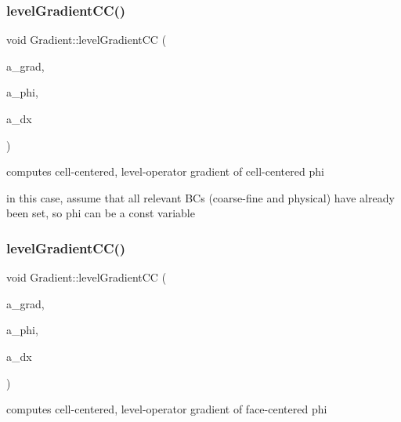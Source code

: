 \subsubsection{\texorpdfstring{level\+Gradient\+C\+C()}{levelGradientCC()}\hspace{0.1cm}{\footnotesize\ttfamily [4/6]}}
{\footnotesize\ttfamily void Gradient\+::level\+Gradient\+CC (\begin{DoxyParamCaption}\item[{\textbf{ Level\+Data}$<$ \textbf{ F\+Array\+Box} $>$ \&}]{a\+\_\+grad,  }\item[{const \textbf{ Level\+Data}$<$ \textbf{ F\+Array\+Box} $>$ \&}]{a\+\_\+phi,  }\item[{const \textbf{ Real}}]{a\+\_\+dx }\end{DoxyParamCaption})\hspace{0.3cm}{\ttfamily [static]}}



computes cell-\/centered, level-\/operator gradient of cell-\/centered phi 

in this case, assume that all relevant BC\textquotesingle{}s (coarse-\/fine and physical) have already been set, so phi can be a const variable \mbox{\label{class_gradient_a8962d5f7dabe25690dce34ce1c00726d}} 
\subsubsection{\texorpdfstring{level\+Gradient\+C\+C()}{levelGradientCC()}\hspace{0.1cm}{\footnotesize\ttfamily [5/6]}}
{\footnotesize\ttfamily void Gradient\+::level\+Gradient\+CC (\begin{DoxyParamCaption}\item[{\textbf{ Level\+Data}$<$ \textbf{ F\+Array\+Box} $>$ \&}]{a\+\_\+grad,  }\item[{const \textbf{ Level\+Data}$<$ \textbf{ Flux\+Box} $>$ \&}]{a\+\_\+phi,  }\item[{const \textbf{ Real}}]{a\+\_\+dx }\end{DoxyParamCaption})\hspace{0.3cm}{\ttfamily [static]}}



computes cell-\/centered, level-\/operator gradient of face-\/centered phi 

